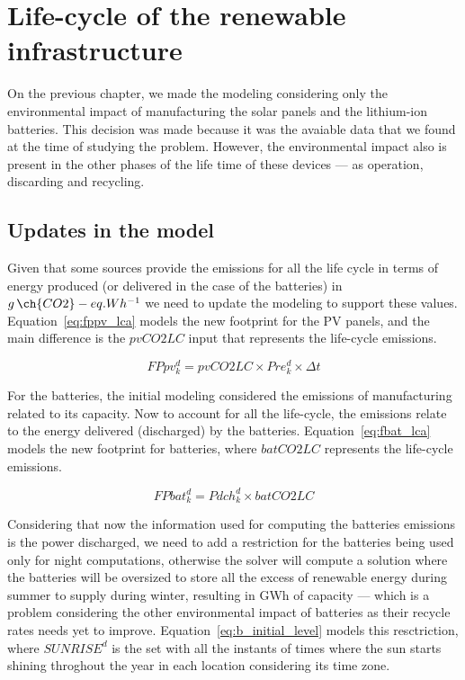 \section{Life-cycle of the renewable infrastructure}

On the previous chapter, we made the modeling considering only the environmental impact of manufacturing the solar panels and the lithium-ion batteries. This decision was made because it was the avaiable data that we found at the time of studying the problem. However, the environmental impact also is present in the other phases of the life time of these devices --- as operation, discarding and recycling.

\subsection{Updates in the model}

Given that some sources provide the emissions for all the life cycle in terms of energy produced (or delivered in the case of the batteries) in $g\,\ch{CO2}-eq.Wh^{-1}$ we need to update the modeling to support these values. Equation~\eqref{eq:fppv_lca} models the new footprint for the PV panels, and the main difference is the $pvCO2LC$ input that represents the life-cycle emissions.

\begin{equation} \label{eq:fppv_lca}
   FPpv^d_k =  pvCO2LC \times Pre_k^d \times \Delta t
\end{equation}


For the batteries, the initial modeling considered the emissions of manufacturing related to its capacity. Now to account for all the life-cycle, the emissions relate to the energy delivered (discharged) by the batteries. Equation~\eqref{eq:fbat_lca} models the new footprint for batteries, where $batCO2LC$ represents the life-cycle emissions. 

\begin{equation} \label{eq:fbat_lca}
   FPbat^d_k =  Pdch^d_k \times batCO2LC
 \end{equation}
 
Considering that now the information used for computing the  batteries emissions is the power discharged, we need to add a restriction for the batteries being used only for night computations, otherwise the solver will compute a solution where the batteries will be oversized to store all the excess of renewable energy during summer to supply during winter, resulting in GWh of capacity --- which is a problem considering the other environmental impact of batteries as their recycle rates needs yet to improve. Equation~\eqref{eq:b_initial_level}  models this resctriction, where $SUNRISE^d$ is the set with all the instants of times where the sun starts shining throghout the year in each location considering its time zone.


